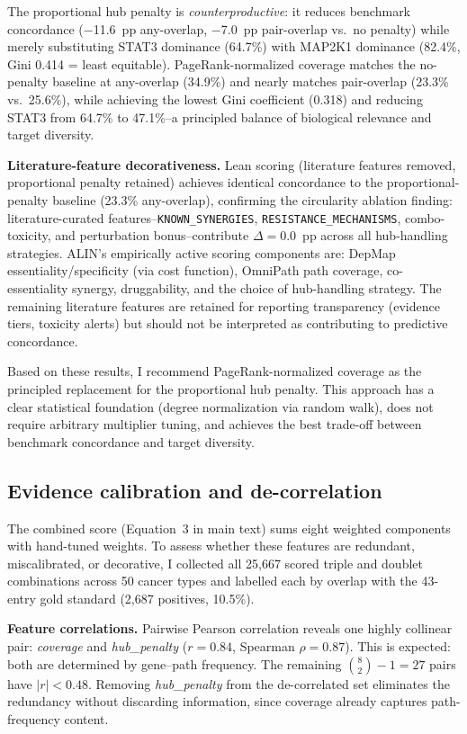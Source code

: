 \documentclass[11pt]{article}
\begin{document}
\noindent The proportional hub penalty is \emph{counterproductive}: it reduces benchmark concordance ($-$11.6~pp any-overlap, $-$7.0~pp pair-overlap vs.\ no penalty) while merely substituting STAT3 dominance (64.7\%) with MAP2K1 dominance (82.4\%, Gini 0.414 = least equitable). PageRank-normalized coverage matches the no-penalty baseline at any-overlap (34.9\%) and nearly matches pair-overlap (23.3\% vs.\ 25.6\%), while achieving the lowest Gini coefficient (0.318) and reducing STAT3 from 64.7\% to 47.1\%--a principled balance of biological relevance and target diversity.

\textbf{Literature-feature decorativeness.} Lean scoring (literature features removed, proportional penalty retained) achieves identical concordance to the proportional-penalty baseline (23.3\% any-overlap), confirming the circularity ablation finding: literature-curated features--\texttt{KNOWN\_SYNERGIES}, \texttt{RESISTANCE\_MECHANISMS}, combo-toxicity, and perturbation bonus--contribute $\Delta = 0.0$~pp across all hub-handling strategies. ALIN's empirically active scoring components are: DepMap essentiality/specificity (via cost function), OmniPath path coverage, co-essentiality synergy, druggability, and the choice of hub-handling strategy. The remaining literature features are retained for reporting transparency (evidence tiers, toxicity alerts) but should not be interpreted as contributing to predictive concordance.

Based on these results, I recommend PageRank-normalized coverage as the principled replacement for the proportional hub penalty. This approach has a clear statistical foundation (degree normalization via random walk), does not require arbitrary multiplier tuning, and achieves the best trade-off between benchmark concordance and target diversity.

\subsection{Evidence calibration and de-correlation}
\label{sec:evidence_calibration}
The combined score (Equation~3 in main text) sums eight weighted components with hand-tuned weights. To assess whether these features are redundant, miscalibrated, or decorative, I collected all 25{,}667 scored triple and doublet combinations across 50 cancer types and labelled each by overlap with the 43-entry gold standard (2{,}687 positives, 10.5\%).

\textbf{Feature correlations.} Pairwise Pearson correlation reveals one highly collinear pair: \emph{coverage} and \emph{hub\_penalty} ($r = 0.84$, Spearman $\rho = 0.87$). This is expected: both are determined by gene--path frequency. The remaining $\binom{8}{2} - 1 = 27$ pairs have $|r| < 0.48$. Removing \emph{hub\_penalty} from the de-correlated set eliminates the redundancy without discarding information, since coverage already captures path-frequency content.
\end{document}
